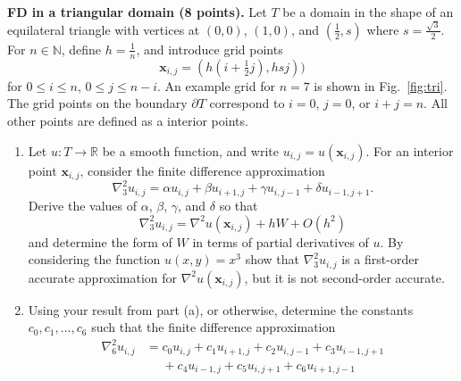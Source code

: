 \documentclass{article}
\def\R{{\mathbb R}}
\def\N{{\mathbb N}}
\newcommand{\p}{\partial}
\renewcommand{\vec}[1]{\mathbf{#1}}
\newcommand{\vx}{\vec{x}}
\begin{document}
\begin{problem} \\ 
  \textbf{FD in a triangular domain (8 points).}
        Let $T$ be a domain in the shape of an equilateral triangle with vertices
        at $(0,0)$, $(1,0)$, and $(\tfrac12,s)$ where $s=\tfrac{\sqrt{3}}{2}$. For $n \in \N$,
        define $h=\tfrac{1}{n}$, and introduce grid points
        \begin{equation}
          \vx_{i,j} = (h(i+\tfrac12 j), hsj))
        \end{equation}
        for $0\le i\le n$, $0\le j \le n-i$. An example grid for $n=7$ is shown in
        Fig.~\ref{fig:tri}. The grid points on the boundary $\p T$ correspond to
        $i=0$, $j=0$, or $i+j=n$. All other points are defined as a interior points.
        \begin{enumerate}
          \item Let $u: T \to \R$ be a smooth function, and write $u_{i,j} =
                  u(\vx_{i,j})$. For an interior point $\vx_{i,j}$, consider the finite
                difference approximation
                \begin{equation}
                  \nabla^2_3u_{i,j} = \alpha u_{i,j} + \beta u_{i+1,j} + \gamma u_{i,j-1} + \delta u_{i-1,j+1}. \label{eq:lap1}
                \end{equation}
                Derive the values of $\alpha$, $\beta$, $\gamma$, and $\delta$ so that
                \begin{equation}
                  \nabla^2_3u_{i,j} = \nabla^2 u (\vx_{i,j}) + h W + O(h^2)
                \end{equation}
                and determine the form of $W$ in terms of partial derivatives of $u$.
                By considering the function $u(x,y)=x^3$ show that $\nabla^2_3 u_{i,j}$
                is a first-order accurate approximation for $\nabla^2 u(\vx_{i,j})$,
                but it is not second-order accurate.
          \item Using your result from part (a), or otherwise, determine
                the constants $c_0,c_1,\ldots, c_6$ such that the finite difference
                approximation
                \begin{align}
                  \nabla^2_6u_{i,j} & = c_0 u_{i,j} + c_1 u_{i+1,j} + c_2 u_{i,j-1} + c_3 u_{i-1,j+1} \nonumber   \\
                                    & \phantom{=}+c_4 u_{i-1,j} + c_5 u_{i,j+1} + c_6 u_{i+1,j-1} \label{eq:lap2}
                \end{align}

\end{enumerate}
\end{problem}
\end{document}
